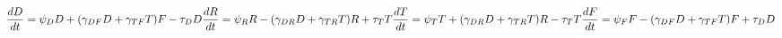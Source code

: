 \documentclass[10pt]{article}
\begin{document}
\[\\
\frac{dD}{dt} = \psi_{D}D + (\gamma_{DF}D+\gamma_{TF}T)F-\tau_{D}D 
\\
\\
\frac{dR}{dt} = \psi_{R}R - (\gamma_{DR}D+\gamma_{TR}T)R+\tau_{T}T
\\
\\
\frac{dT}{dt} = \psi_{T}T + (\gamma_{DR}D+\gamma_{TR}T)R-\tau_{T}T
\\
\\
\frac{dF}{dt} = \psi_{F}F - (\gamma_{DF}D+\gamma_{TF}T)F+\tau_{D}D\]
\end{document}
